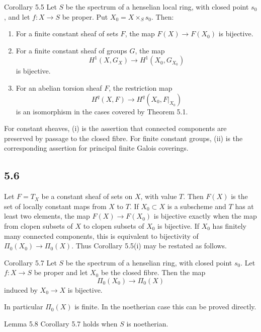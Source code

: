 \begin{statement}{Corollary 5.5}
Let \(S\) be the spectrum of a henselian local ring, with closed point \(s_0\), and let \(f:X\to S\) be proper. Put \(X_0=X\times_Ss_0\). Then:
\begin{enumerate}[label=(\roman*)]
\item For a finite constant sheaf of sets \(F\), the map \(F(X)\to F(X_0)\) is bijective.
\item For a finite constant sheaf of groups \(G\), the map
\[
H^1(X,G_X)\longrightarrow H^1(X_0,G_{X_0})
\]
is bijective.
\item For an abelian torsion sheaf \(F\), the restriction map
\[
H^q(X,F)\longrightarrow H^q(X_0,F|_{X_0})
\]
is an isomorphism in the cases covered by Theorem 5.1.
\end{enumerate}
\end{statement}

For constant sheaves, (i) is the assertion that connected components are preserved by passage to the closed fibre. For finite constant groups, (ii) is the corresponding assertion for principal finite Galois coverings.

\subsection*{5.6}
Let \(F=T_X\) be a constant sheaf of sets on \(X\), with value \(T\). Then \(F(X)\) is the set of locally constant maps from \(X\) to \(T\). If \(X_0\subset X\) is a subscheme and \(T\) has at least two elements, the map \(F(X)\to F(X_0)\) is bijective exactly when the map from clopen subsets of \(X\) to clopen subsets of \(X_0\) is bijective. If \(X_0\) has finitely many connected components, this is equivalent to bijectivity of \(\Pi_0(X_0)\to\Pi_0(X)\). Thus Corollary 5.5(i) may be restated as follows.

\begin{statement}{Corollary 5.7}
Let \(S\) be the spectrum of a henselian ring, with closed point \(s_0\). Let \(f:X\to S\) be proper and let \(X_0\) be the closed fibre. Then the map
\[
\Pi_0(X_0)\longrightarrow\Pi_0(X)
\]
induced by \(X_0\to X\) is bijective.
\end{statement}

In particular \(\Pi_0(X)\) is finite. In the noetherian case this can be proved directly.

\begin{statement}{Lemma 5.8}
Corollary 5.7 holds when \(S\) is noetherian.
\end{statement}

